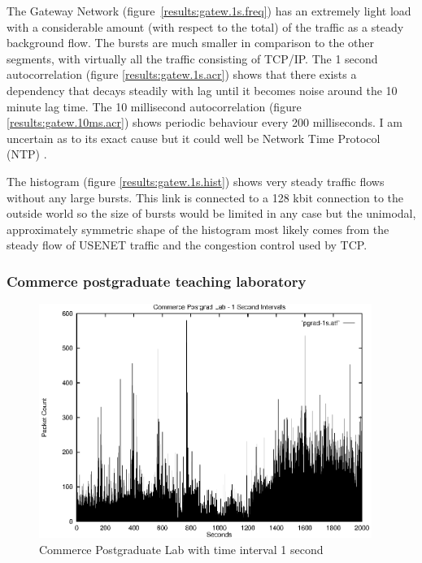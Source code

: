 The Gateway Network (figure~\ref{results:gatew.1s.freq}) has an
extremely light load with a considerable amount (with respect to the
total) of the traffic as a steady background flow.  The bursts are
much smaller in comparison to the other segments, with virtually all
the traffic consisting of TCP/IP.  The 1 second autocorrelation
(figure
\ref{results:gatew.1s.acr}) shows that there exists a dependency that
decays steadily with lag until it becomes noise around the 10 minute
lag time.  The 10 millisecond autocorrelation (figure
\ref{results:gatew.10ms.acr}) shows periodic behaviour every 200
milliseconds.  I am uncertain as to its exact cause but it could well
be Network Time Protocol (NTP) \cite{RFC:1305}.

The histogram (figure \ref{results:gatew.1s.hist}) shows very steady
traffic flows without any large bursts.  This link is connected to a
128 kbit connection to the outside world so the size of bursts would
be limited in any case but the unimodal, approximately symmetric shape
of the histogram most likely comes from the steady flow of USENET
traffic and the congestion control used by TCP.

\subsubsection{Commerce postgraduate teaching laboratory}

\begin{figure}
\includegraphics[height=3in]{pics/pgrad-1s-freq.eps}
\caption{Commerce Postgraduate Lab with time interval 1 second}
\label{results:pgrad.1s.freq}
\end{figure}


